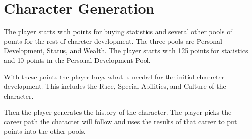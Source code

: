 
\chapter{Character Generation}

The player starts with points for buying statistics and several other pools 
of points for the rest of charcter development. The three 
pools are Personal Development, Status, and Wealth. The player starts 
with 125 points for statistics and 10 points in the Personal 
Development Pool. 

With these points the player buys what is needed for the initial 
character development. This includes the Race, Special Abilities, and 
Culture of the character. 

Then the player generates the history of the character. The player 
picks the career path the character will follow and uses the results 
of that career to put points into the other pools. 

